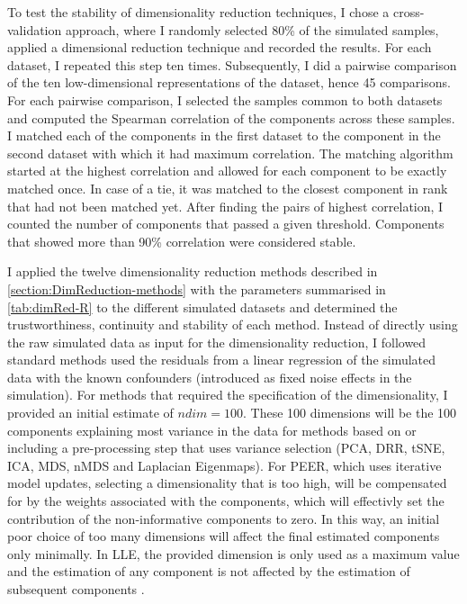 To test the stability of dimensionality reduction techniques, I chose a cross-validation approach, where I randomly selected \num{80}\% of the simulated samples, applied a dimensional reduction technique and recorded the results. For each dataset, I repeated this step ten times. Subsequently, I did a pairwise comparison of the ten low-dimensional representations of the dataset, hence \num{45} comparisons. For each pairwise comparison, I selected the samples common to both datasets and computed the Spearman correlation of the components across these samples. I matched each of the components in the first dataset to the component in the second dataset with which it had maximum correlation. The matching algorithm started at the highest correlation and allowed for each component to be exactly matched once. In case of a tie, it was matched to the closest component in rank that had not been matched yet. After finding the pairs of highest correlation, I counted the number of components that passed a given threshold. Components that showed more than \num{90}\% correlation were considered stable. 

I applied the twelve dimensionality reduction methods described in \cref{section:DimReduction-methods} with the parameters summarised in \cref{tab:dimRed-R} to the different simulated datasets and determined the trustworthiness, continuity and stability of each method.  Instead of directly using the raw simulated data as input for the dimensionality reduction, I followed standard methods used the residuals from a linear regression of the simulated data with the known confounders (introduced as fixed noise effects in the simulation).  For methods that required the specification of the dimensionality, I provided an initial estimate of \(ndim=100\).  These \num{100} dimensions will be the \num{100} components explaining most variance in the data for methods based on or including a pre-processing step that uses variance selection (PCA, DRR, tSNE, ICA, MDS, nMDS and Laplacian Eigenmaps). For PEER, which uses iterative model updates, selecting a dimensionality that is too high, will be compensated for by the weights associated with the components, which will effectivly set the contribution of the non-informative components to  zero. In this way, an initial poor choice of too many dimensions will affect the final estimated components only minimally. In LLE, the provided dimension is only used as a maximum value and the estimation of any component is not affected by the estimation of subsequent components \citep{Roweis2000,Kayo2006}.

